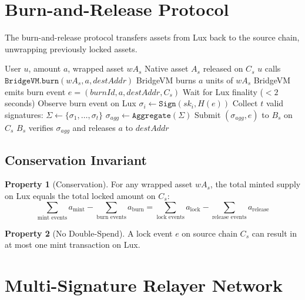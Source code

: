 \documentclass[11pt,a4paper]{article}
\theoremstyle{definition}
\newtheorem{property}{Property}
\begin{document}
\section{Burn-and-Release Protocol}

The burn-and-release protocol transfers assets from Lux back to the source chain, unwrapping previously locked assets.

\begin{algorithm}
\caption{Burn-and-Release Protocol}
\begin{algorithmic}[1]
\Require User $u$, amount $a$, wrapped asset $wA_s$
\Ensure Native asset $A_s$ released on $C_s$
\State $u$ calls $\texttt{BridgeVM.burn}(wA_s, a, destAddr)$
\State BridgeVM burns $a$ units of $wA_s$
\State BridgeVM emits burn event $e = (burnId, a, destAddr, C_s)$
\State Wait for Lux finality ($<2$ seconds)
    \State Observe burn event on Lux
    \State $\sigma_i \gets \texttt{Sign}(sk_i, H(e))$
\EndFor
\State Collect $t$ valid signatures: $\Sigma \gets \{\sigma_1, \ldots, \sigma_t\}$
\State $\sigma_{agg} \gets \texttt{Aggregate}(\Sigma)$
\State Submit $(\sigma_{agg}, e)$ to $B_s$ on $C_s$
\State $B_s$ verifies $\sigma_{agg}$ and releases $a$ to $destAddr$
\end{algorithmic}
\end{algorithm}

\subsection{Conservation Invariant}

\begin{property}[Conservation]
For any wrapped asset $wA_s$, the total minted supply on Lux equals the total locked amount on $C_s$:
\[
\sum_{\text{mint events}} a_{\text{mint}} - \sum_{\text{burn events}} a_{\text{burn}} = \sum_{\text{lock events}} a_{\text{lock}} - \sum_{\text{release events}} a_{\text{release}}
\]
\end{property}

\begin{property}[No Double-Spend]
A lock event $e$ on source chain $C_s$ can result in at most one mint transaction on Lux.
\end{property}

\section{Multi-Signature Relayer Network}
\end{document}
